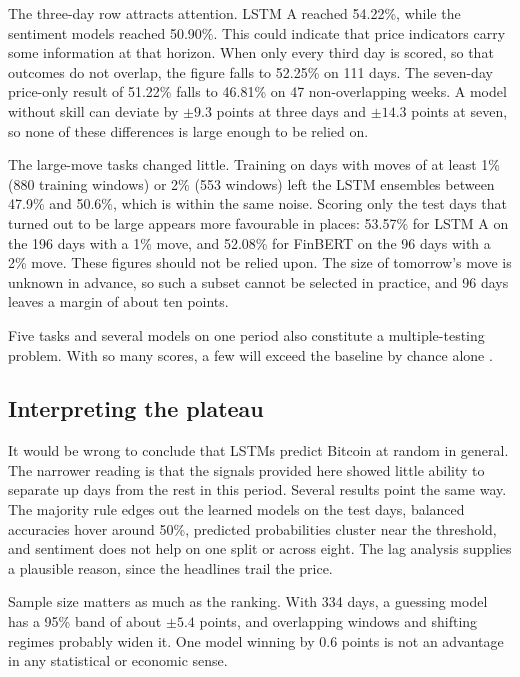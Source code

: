 
The three-day row attracts attention. LSTM A reached 54.22\%, while the sentiment models reached 50.90\%. This could indicate that price indicators carry some information at that horizon. When only every third day is scored, so that outcomes do not overlap, the figure falls to 52.25\% on 111 days. The seven-day price-only result of 51.22\% falls to 46.81\% on 47 non-overlapping weeks. A model without skill can deviate by $\pm9.3$ points at three days and $\pm14.3$ points at seven, so none of these differences is large enough to be relied on.

The large-move tasks changed little. Training on days with moves of at least 1\% (880 training windows) or 2\% (553 windows) left the LSTM ensembles between 47.9\% and 50.6\%, which is within the same noise. Scoring only the test days that turned out to be large appears more favourable in places: 53.57\% for LSTM A on the 196 days with a 1\% move, and 52.08\% for FinBERT on the 96 days with a 2\% move. These figures should not be relied upon. The size of tomorrow's move is unknown in advance, so such a subset cannot be selected in practice, and 96 days leaves a margin of about ten points.

Five tasks and several models on one period also constitute a multiple-testing problem. With so many scores, a few will exceed the baseline by chance alone \cite{harvey2016,bailey2014}.

\subsection{Interpreting the plateau}
It would be wrong to conclude that LSTMs predict Bitcoin at random in general. The narrower reading is that the signals provided here showed little ability to separate up days from the rest in this period. Several results point the same way. The majority rule edges out the learned models on the test days, balanced accuracies hover around 50\%, predicted probabilities cluster near the threshold, and sentiment does not help on one split or across eight. The lag analysis supplies a plausible reason, since the headlines trail the price.

Sample size matters as much as the ranking. With 334 days, a guessing model has a 95\% band of about $\pm5.4$ points, and overlapping windows and shifting regimes probably widen it. One model winning by 0.6 points is not an advantage in any statistical or economic sense.

